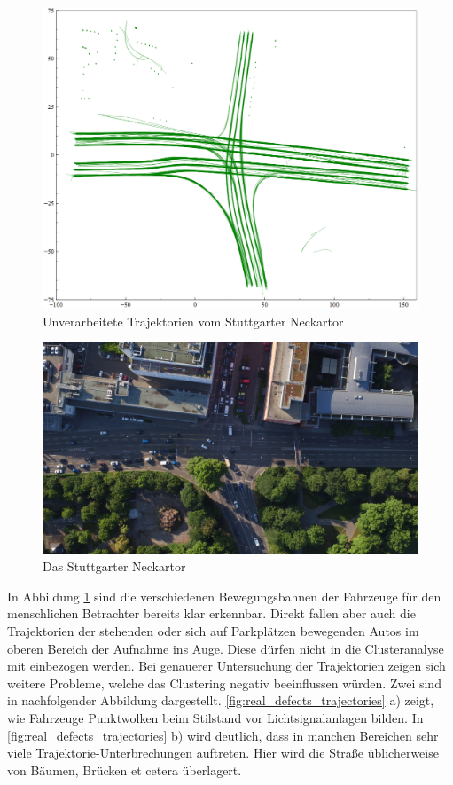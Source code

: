 \begin{figure}[H]
\centering
    \includegraphics[width=0.5\linewidth]{../resources/img/umsetzung/U1/Plot_RawTrajectories_Neckartor}
\caption{Unverarbeitete Trajektorien vom Stuttgarter Neckartor}
\label{fig:real_trajs_raw_neckartor}
\end{figure}

\begin{figure}[H]
\centering
    \includegraphics[width=0.7\linewidth]{../resources/img/umsetzung/U1/Neckartor_Aufnahme}
\caption{Das Stuttgarter Neckartor}
\label{fig:real_neckartor}
\end{figure}

In Abbildung \ref{fig:real_trajs_raw_neckartor} sind die verschiedenen Bewegungsbahnen der Fahrzeuge für
den menschlichen Betrachter bereits klar erkennbar.
Direkt fallen aber auch die Trajektorien der stehenden oder sich auf Parkplätzen
bewegenden Autos im oberen Bereich der Aufnahme ins Auge. Diese dürfen nicht in die Clusteranalyse mit einbezogen werden.
Bei genauerer Untersuchung der Trajektorien zeigen sich weitere Probleme, welche das Clustering negativ
beeinflussen würden. Zwei sind in nachfolgender Abbildung dargestellt.
\ref{fig:real_defects_trajectories} a) zeigt, wie Fahrzeuge Punktwolken beim Stilstand vor Lichtsignalanlagen bilden.
In \ref{fig:real_defects_trajectories} b) wird deutlich, dass in manchen Bereichen sehr viele Trajektorie-Unterbrechungen
auftreten. Hier wird die Straße üblicherweise von Bäumen, Brücken et cetera überlagert.

